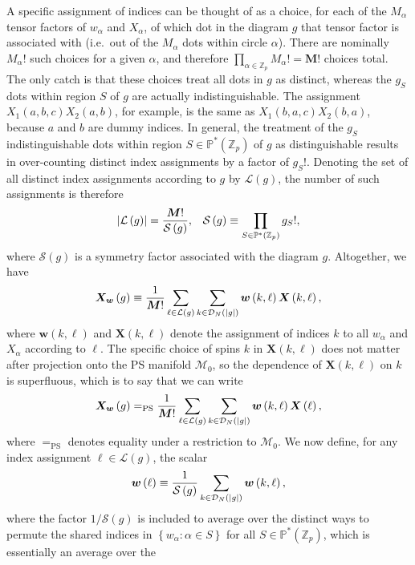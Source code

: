 \documentclass[nofootinbib,notitlepage,11pt]{revtex4-2}
\newcommand{\f}[2]{\dfrac{#1}{#2}} %
\newcommand{\p}[1]{\left(#1\right)} %
\renewcommand{\set}[1]{\left\{#1\right\}} %
\newcommand{\m}{\bm} %
\newcommand{\1}{\mathds{1}}
\newcommand{\D}{\mathcal{D}}
\renewcommand{\L}{\mathcal{L}}
\newcommand{\M}{\mathcal{M}}
\renewcommand{\S}{\mathcal{S}}
\newcommand{\PP}{\mathbb{P}}
\newcommand{\ZZ}{\mathbb{Z}}
\newcommand{\EQPS}{=_{\text{PS}}}
\begin{document}
A specific assignment of indices can be thought of as a choice, for
each of the $M_\alpha$ tensor factors of $w_\alpha$ and $X_\alpha$, of
which dot in the diagram $g$ that tensor factor is associated with
(i.e.~out of the $M_\alpha$ dots within circle $\alpha$).  There are
nominally $M_\alpha!$ such choices for a given $\alpha$, and therefore
$\prod_{\alpha\in\ZZ_p}M_\alpha!=\m M!$ choices total.  The only catch
is that these choices treat all dots in $g$ as distinct, whereas the
$g_S$ dots within region $S$ of $g$ are actually indistinguishable.
The assignment $X_1\p{a,b,c} X_2\p{a,b}$, for example, is the same as
$X_1\p{b,a,c} X_2\p{b,a}$, because $a$ and $b$ are dummy indices.  In
general, the treatment of the $g_S$ indistinguishable dots within
region $S\in\PP^*\p{\ZZ_p}$ of $g$ as distinguishable results in
over-counting distinct index assignments by a factor of $g_S!$.
Denoting the set of all distinct index assignments according to $g$ by
$\L\p{g}$, the number of such assignments is therefore
\begin{align}
  \abs{\L\p{g}} = \f{\m M!}{\S\p{g}},
  &&
  \S\p{g} \equiv \prod_{S\in\PP^*\p{\ZZ_p}} g_S!,
\end{align}
where $\S\p{g}$ is a symmetry factor associated with the diagram $g$.
Altogether, we have
\begin{align}
  \m X_{\m w}\p{g} \equiv \f1{\m M!} \sum_{\ell\in\L\p{g}}
  \sum_{k\in\D_N\p{\abs{g}}} \m w\p{k,\ell} \m X\p{k,\ell},
\end{align}
where $\m w\p{k,\ell}$ and $\m X\p{k,\ell}$ denote the assignment of
indices $k$ to all $w_\alpha$ and $X_\alpha$ according to $\ell$.  The
specific choice of spins $k$ in $\m X\p{k,\ell}$ does not matter after
projection onto the PS manifold $\M_0$, so the dependence of
$\m X\p{k,\ell}$ on $k$ is superfluous, which is to say that we can
write
\begin{align}
  \m X_{\m w}\p{g} \EQPS \f1{\m M!} \sum_{\ell\in\L\p{g}}
  \sum_{k\in\D_N\p{\abs{g}}} \m w\p{k,\ell} \m X\p{\ell},
\end{align}
where $\EQPS$ denotes equality under a restriction to $\M_0$.  We now
define, for any index assignment $\ell\in\L\p{g}$, the scalar
\begin{align}
  \m w\p{\ell}
  \equiv \f1{\S\p{g}} \sum_{k\in\D_N\p{\abs{g}}} \m w\p{k,\ell},
  \label{eq:assignment_scalar}
\end{align}
where the factor $1/\S\p{g}$ is included to average over the distinct
ways to permute the shared indices in $\set{w_\alpha:\alpha\in S}$ for
all $S\in\PP^*\p{\ZZ_p}$, which is essentially an average over the
\end{document}
